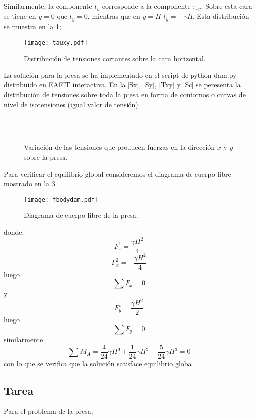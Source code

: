 \documentclass[../notas medios.tex]{subfiles}
\begin{document}
Similarmente, la componente $t_y$ corresponde a la componente $\tau_{xy}$. Sobre esta cara se tiene en $y=0$  que $t_y = 0$, mientras que en $y=H$ $t_y = - \gamma H$. Esta distribución se muestra en la \cref{taoxy};

\begin{figure}[H]
\centering
	\texttt{[image: tauxy.pdf]}
	\caption{Distribución de tensiones cortantes sobre la cara horizontal.}
	\label{taoxy}
\end{figure}


La solución para la presa se ha implementado en el script de python dam.py distribuido en EAFIT interactiva. En la \cref{Sx}, \cref{Sy}, \cref{Txy} y \cref{Sc} se peresenta la distribución de tensiones sobre toda la presa en forma de contornos o curvas de nivel de isotensiones (igual valor de tensión)

\begin{figure}[H]
     \centering
     \hspace{0.5cm}
     \\
     \hspace{0.5cm}
     \\
     \caption{Variación de las tensiones que producen fuerzas en la dirección $x$ y $y$ sobre la presa.}
     \label{python}
\end{figure}


Para verificar el equilibrio global consideremos el diagrama de cuerpo libre mostrado en la \cref{dcl}

\begin{figure}[H]
\centering
	\texttt{[image: fbodydam.pdf]}
	\caption{Diagrama de cuerpo libre de la presa.}
	\label{dcl}
\end{figure}


donde;
\[F_x^1 = \frac{{\gamma {H^2}}}{4}\]
\[F_x^2 =  - \frac{{\gamma {H^2}}}{4}\]
luego
\[\sum {{F_x} = 0} \]
y
\[F_y^1 = \frac{{\gamma {H^2}}}{2}\]
luego
\[\sum {{F_y} = 0} \]
similarmente
\[\sum {{M_A} = } \frac{4}{{24}}\gamma {H^3} + \frac{1}{{24}}\gamma {H^3} - \frac{5}{{24}}\gamma {H^3} = 0\]
con lo que se verifica que la solución satisface equilibrio global.

\subsection*{Tarea}
Para el problema de la presa;
\end{document}
